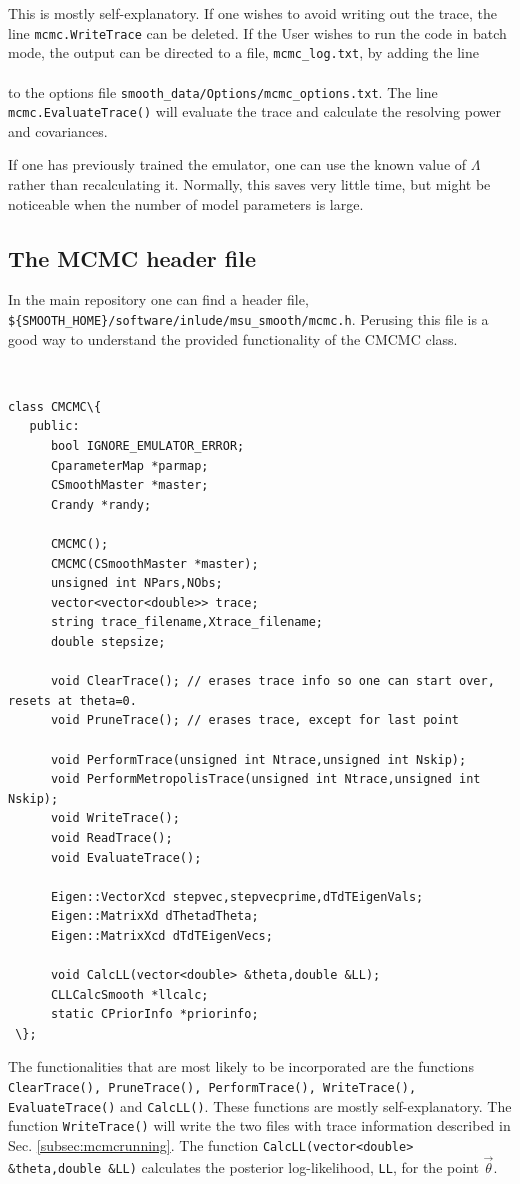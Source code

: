 \documentclass[UserManual.tex]{subfiles}
\begin{document}
This is mostly self-explanatory. If one wishes to avoid writing out the trace, the line {\tt mcmc.WriteTrace} can be deleted. If the User wishes to run the code in batch mode, the output can be directed to a file, {\tt mcmc\_log.txt}, by adding the line\\
\hspace*{20pt}{\tt LogFileName mcmc\_log.txt} \\
to the options file {\tt smooth\_data/Options/mcmc\_options.txt}. The line {\tt mcmc.EvaluateTrace()} will evaluate the trace and calculate the resolving power and covariances.

If one has previously trained the emulator, one can use the known value of $\Lambda$ rather than recalculating it. Normally, this saves very little time, but might be noticeable when the number of model parameters is large.

\subsection{The MCMC header file}

In the main repository one can find a header file, {\tt \$\{SMOOTH\_HOME\}/software/inlude/msu\_smooth/mcmc.h}. Perusing this file is a good way to understand the provided functionality of the CMCMC class. 
{\tt
\begin{Verbatim}[commandchars=\\\{\}]
class CMCMC\{
   public:
      bool IGNORE_EMULATOR_ERROR;
      CparameterMap *parmap;
      CSmoothMaster *master;
      Crandy *randy;
      
      CMCMC();
      CMCMC(CSmoothMaster *master);
      unsigned int NPars,NObs;
      vector<vector<double>> trace;
      string trace_filename,Xtrace_filename;
      double stepsize;
      
      void ClearTrace(); // erases trace info so one can start over, resets at theta=0.
      void PruneTrace(); // erases trace, except for last point
      
      void PerformTrace(unsigned int Ntrace,unsigned int Nskip);
      void PerformMetropolisTrace(unsigned int Ntrace,unsigned int Nskip);
      void WriteTrace();
      void ReadTrace();
      void EvaluateTrace();
      
      Eigen::VectorXcd stepvec,stepvecprime,dTdTEigenVals;
      Eigen::MatrixXd dThetadTheta;
      Eigen::MatrixXcd dTdTEigenVecs;

      void CalcLL(vector<double> &theta,double &LL);
      CLLCalcSmooth *llcalc;
      static CPriorInfo *priorinfo;
 \};
\end{Verbatim}
}
The functionalities that are most likely to be incorporated are the functions {\tt ClearTrace(), PruneTrace(), PerformTrace(), WriteTrace(), EvaluateTrace()} and {\tt CalcLL()}. These functions are mostly self-explanatory. The function {\tt WriteTrace()} will write the two files with trace information described in Sec. \ref{subsec:mcmcrunning}. The function {\tt CalcLL(vector<double> \&theta,double \&LL)} calculates the posterior log-likelihood, {\tt LL}, for the point $\vec{\theta}$.
\end{document}
